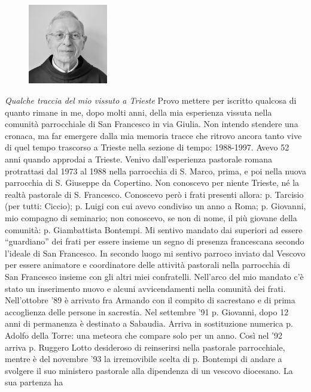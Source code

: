 \begin{figure}
\centering
\includegraphics[width=0.31\textwidth]{immagini/lorenzo.jpg}
\end{figure}
\textit{Qualche traccia del mio vissuto a Trieste}
\medbreak
Provo mettere per iscritto qualcosa di quanto rimane in me, dopo molti anni, della mia
esperienza vissuta nella comunità parrocchiale di San Francesco in via Giulia. 
Non intendo stendere una cronaca, ma far emergere dalla mia memoria tracce che ritrovo ancora 
tanto vive di quel tempo trascorso a Trieste nella sezione di tempo: 1988-1997.
Avevo 52 anni quando approdai a Trieste. Venivo dall’esperienza pastorale romana protrattasi dal 
1973 al 1988 nella parrocchia di S. Marco, prima, e poi nella nuova parrocchia di S. Giuseppe da 
Copertino.
Non conoscevo per niente Trieste, né la realtà pastorale di S. Francesco. Conoscevo però i 
frati presenti allora: p. Tarcisio (per tutti: Ciccio); p. Luigi con cui avevo condiviso un anno a 
Roma; p. Giovanni, mio compagno di seminario; non conoscevo, se non di nome, il più giovane 
della comunità: p. Giambattista Bontempi.
Mi sentivo mandato dai superiori ad essere “guardiano” dei frati per essere insieme un segno di 
presenza francescana secondo l'ideale di San Francesco. In secondo luogo mi sentivo parroco 
inviato dal Vescovo per essere animatore e coordinatore delle attività pastorali nella parrocchia di 
San Francesco insieme con gli altri miei confratelli.
Nell'arco del mio mandato c'è stato un inserimento nuovo e alcuni avvicendamenti nella 
comunità dei frati. Nell'ottobre '89 è arrivato fra Armando con il compito di sacrestano e di prima 
accoglienza delle persone in sacrestia. Nel settembre '91 p. Giovanni, dopo 12 anni di permanenza è 
destinato a Sabaudia. Arriva in sostituzione numerica p. Adolfo della Torre: una meteora che 
compare solo per un anno. Così nel '92 arriva p. Ruggero Lotto desideroso di reinserirsi nella 
pastorale parrocchiale, mentre  è del novembre '93 la irremovibile scelta di p. Bontempi di andare a 
svolgere il suo ministero pastorale alla dipendenza di un vescovo diocesano. La sua partenza ha 

